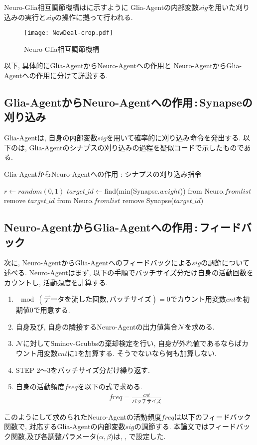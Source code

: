 Neuro-Glia相互調節機構はに示すように
Glia-Agentの内部変数$sig$を用いた刈り込みの実行と$sig$の操作に拠って行われる.
\begin{figure}[H]
\centering
\texttt{[image: NewDeal-crop.pdf]}  
\caption{Neuro-Glia相互調節機構}
\label{fig:NeuroGlia}
\end{figure}
以下, 具体的にGlia-AgentからNeuro-Agentへの作用と
Neuro-AgentからGlia-Agentへの作用に分けて詳説する.
\subsection*{Glia-AgentからNeuro-Agentへの作用\,:\,Synapseの刈り込み}
Glia-Agentは, 自身の内部変数$sig$を用いて確率的に刈り込み命令を発出する.
以下のは, Glia-Agentのシナプスの刈り込みの過程を疑似コードで示したものである.
\begin{algorithm}[H]
\caption{Glia-AgentからNeuro-Agentへの作用\,\,:\,\,シナプスの刈り込み指令}
\label{alg:tis}
\begin{algorithmic}[1]

    \State $r \gets random(0,1)$
       \State $target\_id\gets$find(min(Synapse.$weight$)) from Neuro.$fromlist$
       \State remove $target\_id$ from Neuro.$fromlist$
       \State remove Synapse($target\_id$)
      \EndIf
\EndFunction
\end{algorithmic}
\end{algorithm}
\subsection*{Neuro-AgentからGlia-Agentへの作用\,:\,フィードバック}
  次に, Neuro-AgentからGlia-Agentへのフィードバックによる$sig$の調節について述べる.
  Neuro-Agentはまず, 以下の手順でバッチサイズ分だけ自身の活動回数をカウントし, 活動頻度を計算する.
\begin{enumerate}[STEP 1.]
  \item $\mod(\text{データを流した回数},バッチサイズ)=0$でカウント用変数$cnt$を初期値$0$で用意する.
  \item 自身及び, 自身の隣接するNeuro-Agentの出力値集合$\mathcal{N}$を求める.
  \item $\mathcal{N}$に対してSminov-Grubbsの棄却検定を行い, 自身が外れ値であるならばカウント用変数$cnt$に$1$を加算する. そうでないなら何も加算しない.
  \item STEP 2〜3をバッチサイズ分だけ繰り返す.
  \item 自身の活動頻度$freq$を以下の式で求める. 
  \begin{align}
      freq=\displaystyle\frac{cnt}{バッチサイズ}
  \end{align}
\end{enumerate}
このようにして求められたNeuro-Agentの活動頻度$freq$は以下のフィードバック関数で, 
対応するGlia-Agentの内部変数$sig$の調節する.
本論文ではフィードバック関数,及び各調整パラメータ($\alpha, \beta$)は, 
, で設定した.


